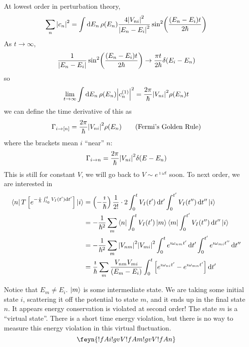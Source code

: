 \documentclass[a4paper,twoside,master.tex]{subfiles}
\begin{document}
At lowest order in perturbation theory,
\begin{equation}
    \sum_n \abs{c_n}^2 = \int \dd{E_n} \rho(E_n) \frac{4 \abs{V_{ni}}^2}{\abs{E_n - E_i}^2} \sin[2](\frac{(E_n - E_i)t}{2 \hbar})
\end{equation}
As $ t \to \infty $,
\begin{equation}
    \frac{1}{\abs{E_n - E_i}} \sin[2](\frac{(E_n - E_i) t}{2 \hbar}) \to \frac{\pi t}{2 \hbar} \delta(E_i - E_n)
\end{equation}
so
\begin{equation}
    \lim_{t \to \infty} \int \dd{E_n} \rho(E_n) \abs{c_n^{(1)}}^2 = \frac{2 \pi}{\hbar} \abs{V_{ni}}^2 \rho(E_n) t
\end{equation}
we can define the time derivative of this as
\begin{equation}\label{eq:fermis_golden_rule}
    \Gamma_{i \to [n]} = \frac{2 \pi}{\hbar} \abs{V_{ni}}^2 \rho(E_n) \tag{Fermi's Golden Rule}
\end{equation}
where the brackets mean $ i $ ``near'' $ n $:
\begin{equation}
    \Gamma_{i \to n} = \frac{2 \pi}{\hbar} \abs{V_{ni}}^2 \delta(E - E_n)
\end{equation}
This is still for constant $ V $, we will go back to $ V \sim e^{\imath \omega t} $ soon. To next order, we are interested in
\begin{align}
    \bra{n} T \left[ e^{- \frac{\imath}{\hbar} \int_{t_0}^t V_I(t') \dd{t'}} \right]\ket{i} &= \left( - \frac{\imath}{\hbar} \right) \frac{1}{2!} \cdot 2 \int_{0}^t V_I(t') \dd{t'} \int_0^{t'} V_I(t'') \dd{t''}\ket{i} \\
    &= - \frac{1}{\hbar^2} \sum_m\bra{n} \int_0^t V_I(t')\ket{m}\bra{m} \int_0^{t'} V_I(t'') \dd{t''}\ket{i} \\
    &= - \frac{1}{\hbar^2} \sum_m \abs{V_{nm}}^2 \abs{V_{mi}}^2 \int_0^{t} e^{\imath \omega_{nm} t'} \dd{t'} \int_0^{t'} e^{\imath \omega_{mi} t''} \dd{t''} \\
    &= \frac{\imath}{\hbar} \sum_m \frac{V_{nm} V_{mi}}{(E_m - E_i)} \int_0^t \left[ e^{\imath \omega_{ni} t'} - e^{\imath \omega_{mn} t'}\right] \dd{t'}
\end{align}

Notice that $ E_m \neq E_i $. $\ket{m} $ is some intermediate state. We are taking some initial state $ i $, scattering it off the potential to state $ m $, and it ends up in the final state $ n $. It appears energy conservation is violated at second order! The state $ m $ is a ``virtual state''. There is a short time energy violation, but there is no way to measure this energy violation in this virtual fluctuation.
\begin{equation}
    \feyn{!{fA}{i} !{gv}{V} !{fA}{m} !{gv}{V} !{fA}{n}}
\end{equation}
\end{document}
